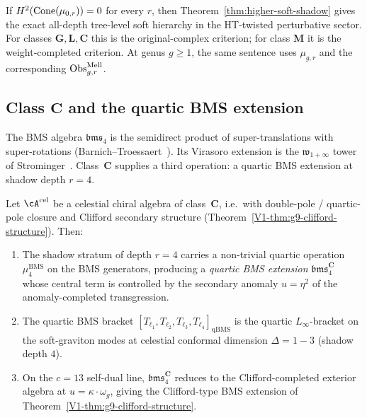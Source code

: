 \begin{remark}
\label{rem:higher-soft-obstruction-free}
If $H^2(\operatorname{Cone}(\mu_{0,r}))=0$ for every $r$, then
Theorem~\ref{thm:higher-soft-shadow} gives the exact all-depth
tree-level soft hierarchy in the HT-twisted perturbative sector. For classes
$\mathbf G,\mathbf L,\mathbf C$ this is the original-complex
criterion; for class $\mathbf M$ it is the weight-completed criterion.
At genus \(g\ge1\), the same sentence uses \(\mu_{g,r}\) and the corresponding
\(\operatorname{Obs}^{\mathrm{Mell}}_{g,r}\).
\end{remark}

\subsection{Class $\mathbf C$ and the quartic BMS extension}
\label{subsec:class-C-quartic-bms}

The BMS algebra $\mathfrak{bms}_4$ is the semidirect product of super-translations with super-rotations (Barnich--Troessaert~\cite{BarnichTroessaertBMS}). Its Virasoro extension is the $\mathfrak{w}_{1+\infty}$ tower of Strominger~\cite{StromingerWInfinityCelestial}. Class~$\mathbf C$ supplies a third operation: a quartic BMS extension at shadow depth $r=4$.

\begin{theorem}
\label{thm:class-C-quartic-bms}
Let $\cA^{\mathrm{cel}}$ be a celestial chiral algebra of class~$\mathbf C$,
i.e.\ with double-pole / quartic-pole closure and Clifford secondary
structure (Theorem~\ref{V1-thm:g9-clifford-structure}). Then:
\begin{enumerate}[label=\textup{(\roman*)}]
\item The shadow stratum of depth $r=4$ carries a non-trivial quartic
operation $\mu_4^{\mathrm{BMS}}$ on the BMS generators, producing a
\emph{quartic BMS extension} $\mathfrak{bms}_4^{\mathbf C}$ whose
central term is controlled by the secondary anomaly $u = \eta^2$
of the anomaly-completed transgression.
\item The quartic BMS bracket
$[T_{\ell_1},T_{\ell_2},T_{\ell_3},T_{\ell_4}]_{\mathrm{qBMS}}$
is the quartic $L_\infty$-bracket on the soft-graviton modes at
celestial conformal dimension $\Delta = 1-3$ (shadow depth $4$).
\item On the $c=13$ self-dual line, $\mathfrak{bms}_4^{\mathbf C}$
reduces to the Clifford-completed exterior algebra at
$u = \kappa\cdot\omega_g$, giving the Clifford-type BMS extension
of Theorem~\ref{V1-thm:g9-clifford-structure}.
\end{enumerate}
\end{theorem}

